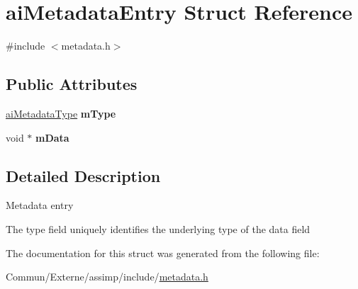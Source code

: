 \hypertarget{structai_metadata_entry}{}\section{ai\+Metadata\+Entry Struct Reference}
\label{structai_metadata_entry}


{\ttfamily \#include $<$metadata.\+h$>$}

\subsection*{Public Attributes}
\begin{DoxyCompactItemize}
\item 
\hyperlink{metadata_8h_aa910906c37416da57bb36335a4d04232}{ai\+Metadata\+Type} {\bfseries m\+Type}\hypertarget{structai_metadata_entry_a075b29cd710e153f5402f479a7a10aee}{}\label{structai_metadata_entry_a075b29cd710e153f5402f479a7a10aee}

\item 
void $\ast$ {\bfseries m\+Data}\hypertarget{structai_metadata_entry_a97fe80a47846374edd38bda5b50b99b3}{}\label{structai_metadata_entry_a97fe80a47846374edd38bda5b50b99b3}

\end{DoxyCompactItemize}


\subsection{Detailed Description}
Metadata entry

The type field uniquely identifies the underlying type of the data field 

The documentation for this struct was generated from the following file\+:\begin{DoxyCompactItemize}
\item 
Commun/\+Externe/assimp/include/\hyperlink{metadata_8h}{metadata.\+h}\end{DoxyCompactItemize}
